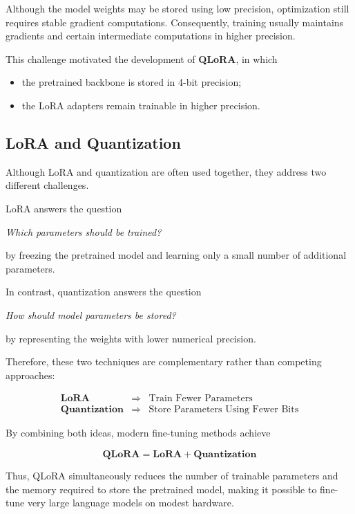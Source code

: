 Although the model weights may be stored using low precision, optimization still requires stable gradient computations. Consequently, training usually maintains gradients and certain intermediate computations in higher precision.

This challenge motivated the development of \textbf{QLoRA}, in which

\begin{itemize}
    \item the pretrained backbone is stored in 4-bit precision;
    \item the LoRA adapters remain trainable in higher precision.
\end{itemize}
\subsection*{LoRA and Quantization}

Although LoRA and quantization are often used together, they address two different challenges.

LoRA answers the question

\begin{center}
\emph{Which parameters should be trained?}
\end{center}

by freezing the pretrained model and learning only a small number of additional parameters.

In contrast, quantization answers the question

\begin{center}
\emph{How should model parameters be stored?}
\end{center}

by representing the weights with lower numerical precision.

Therefore, these two techniques are complementary rather than competing approaches:

\[
\begin{array}{ccc}
\textbf{LoRA} & \Longrightarrow & \text{Train Fewer Parameters} \\[0.3cm]
\textbf{Quantization} & \Longrightarrow & \text{Store Parameters Using Fewer Bits}
\end{array}
\]

By combining both ideas, modern fine-tuning methods achieve

\[
\boxed{
\textbf{QLoRA}
=
\textbf{LoRA}
+
\textbf{Quantization}
}
\]

Thus, QLoRA simultaneously reduces the number of trainable parameters and the memory required to store the pretrained model, making it possible to fine-tune very large language models on modest hardware.

